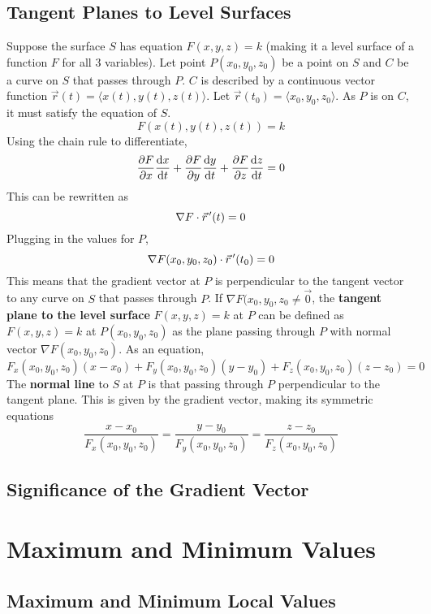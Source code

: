 \documentclass[../Calculus_\Roman{3}]{subfiles}
\begin{document}
		\subsection*{Tangent Planes to Level Surfaces}
			Suppose the surface $S$ has equation $F(x, y, z) = k$ (making it a level surface of a function $F$ for all 3 variables). Let point $P(x_0, y_0, z_0)$ be a point on $S$ and $C$ be a curve on $S$ that passes through $P$. $C$ is described by a continuous vector function $\vec{r}(t) = \langle x(t), y(t), z(t) \rangle$. Let $\vec{r}(t_0) = \langle x_0, y_0, z_0 \rangle$. As $P$ is on $C$, it must satisfy the equation of $S$.
				\[F(x(t), y(t), z(t)) = k\]
				Using the chain rule to differentiate,
					\[\frac{\partial F}{\partial x}\frac{\mathrm{d} x}{\mathrm{d} t} + \frac{\partial F}{\partial y}\frac{\mathrm{d} y}{\mathrm{d} t} + \frac{\partial F}{\partial z}\frac{\mathrm{d} z}{\mathrm{d} t} = 0\]
				This can be rewritten as
				\[\nabla F \cdot \vec{r}\hspace{0.5mm}'(t) = 0\]
				Plugging in the values for $P$,
					\[\nabla F(x_0, y_0, z_0) \cdot \vec{r}\hspace{0.5mm}'(t_0) = 0\]
				This means that the gradient vector at $P$ is perpendicular to the tangent vector to any curve on $S$ that passes through $P$. If $\nabla F(x_0, y_0, z_0 \ne \vec{0}$, the \textbf{tangent plane to the level surface} $F(x, y, z) = k$ at $P$ can be defined as $F(x, y, z) = k$ at $P(x_0, y_0, z_0)$ as the plane passing through $P$ with normal vector $\nabla F(x_0, y_0, z_0)$. As an equation,
					\[F_x(x_0, y_0, z_0)(x - x_0) + F_y(x_0, y_0, z_0)(y - y_0) + F_z(x_0, y_0, z_0)(z - z_0) = 0\]
			The \textbf{normal line} to $S$ at $P$ is that passing through $P$ perpendicular to the tangent plane. This is given by the gradient vector, making its symmetric equations
				\[\frac{x - x_0}{F_x(x_0, y_0, z_0)} = \frac{y - y_0}{F_y(x_0, y_0, z_0)} = \frac{z - z_0}{F_z(x_0, y_0, z_0)}\]
		\subsection*{Significance of the Gradient Vector}
	\section{Maximum and Minimum Values}
		\subsection*{Maximum and Minimum Local Values}
\end{document}
